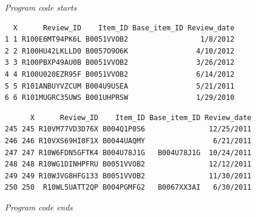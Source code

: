 \emph{Program code starts}

\begin{Shaded}
\begin{Highlighting}[]
\OtherTok{\textless{}{-}} 

\OtherTok{\textless{}{-}}  \NormalTok{)}


\OtherTok{\textless{}{-}}\NormalTok{ df[, }\SpecialCharTok{:}\NormalTok{]}

\end{Highlighting}
\end{Shaded}

\begin{verbatim}
  X      Review_ID    Item_ID Base_item_ID Review_date
1 1 R100E6MT94PK6L B0051VVOB2                 1/8/2012
2 2 R100HU42LKLLD0 B0057O9O6K                4/10/2012
3 3 R100PBXP49AU0B B0051VVOB2                3/26/2012
4 4 R100U020EZR95F B0051VVOB2                6/14/2012
5 5 R101ANBUYVZCUM B004U9USEA                5/21/2011
6 6 R101MUGRC35UWS B001UHPRSW                1/29/2010
\end{verbatim}

\begin{Shaded}
\begin{Highlighting}[]
\end{Highlighting}
\end{Shaded}

\begin{verbatim}
      X      Review_ID    Item_ID Base_item_ID Review_date
245 245 R10VM77VD3D76X B004Q1P0S6               12/25/2011
246 246 R10VXS69HI0F1X B0044UAQMY                6/21/2011
247 247 R10W6FDN5GFTK4 B004U78J1G   B004U78J1G  10/24/2011
248 248 R10WG1DINHPFRU B0051VVOB2               12/12/2011
249 249 R10WJVG8HFG133 B0051VVOB2               11/30/2011
250 250  R10WL5UATT2QP B004PGMFG2   B0067XX3AI   6/30/2011
\end{verbatim}

\emph{Program code ends}

